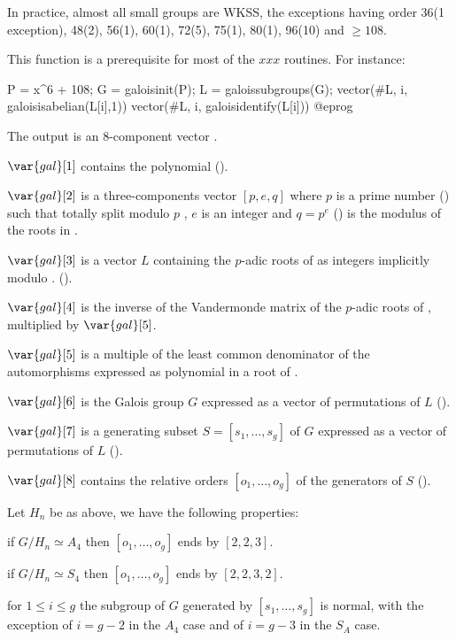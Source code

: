 In practice, almost all small groups are WKSS, the exceptions having order
36(1 exception), 48(2), 56(1), 60(1), 72(5), 75(1), 80(1), 96(10) and $\geq
108$.

This function is a prerequisite for most of the $xxx$ routines.
For instance:

\bprog
P = x^6 + 108;
G = galoisinit(P);
L = galoissubgroups(G);
vector(#L, i, galoisisabelian(L[i],1))
vector(#L, i, galoisidentify(L[i]))
@eprog

The output is an 8-component vector .

$\var{gal}[1]$ contains the polynomial 
().

$\var{gal}[2]$ is a three-components vector $[p,e,q]$ where $p$ is a
prime number () such that  totally split
modulo $p$ , $e$ is an integer and $q=p^e$ () is the
modulus of the roots in .

$\var{gal}[3]$ is a vector $L$ containing the $p$-adic roots of
 as integers implicitly modulo .
().

$\var{gal}[4]$ is the inverse of the Vandermonde matrix of the
$p$-adic roots of , multiplied by $\var{gal}[5]$.

$\var{gal}[5]$ is a multiple of the least common denominator of the
automorphisms expressed as polynomial in a root of .

$\var{gal}[6]$ is the Galois group $G$ expressed as a vector of
permutations of $L$ ().

$\var{gal}[7]$ is a generating subset $S=[s_1,\ldots,s_g]$ of $G$
expressed as a vector of permutations of $L$ ().

$\var{gal}[8]$ contains the relative orders $[o_1,\ldots,o_g]$ of
the generators of $S$ ().

Let $H_n$ be as above, we have the following properties:

\quad\item if $G/H_n\simeq A_4$ then $[o_1,\ldots,o_g]$ ends by
$[2,2,3]$.

\quad\item if $G/H_n\simeq S_4$ then $[o_1,\ldots,o_g]$ ends by
$[2,2,3,2]$.

\quad\item for $1\leq i \leq g$ the subgroup of $G$ generated by
$[s_1,\ldots,s_g]$ is normal, with the exception of $i=g-2$ in the
$A_4$ case and of $i=g-3$ in the $S_A$ case.

